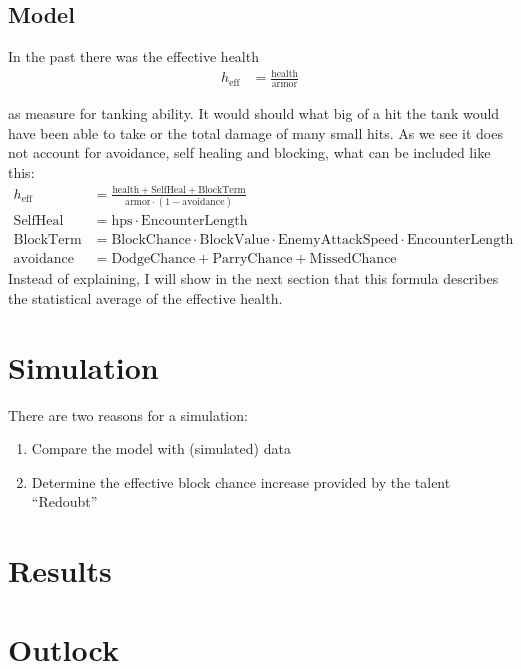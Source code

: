\documentclass[a4paper,10pt]{article}
\begin{document}
\subsection{Model}
In the past there was the effective health 
\begin{align*}
 h_\mathrm{eff}&=\frac{\mathrm{health}}{\mathrm{armor}}
\end{align*}

as measure for tanking ability. It would should what big of a hit the tank would have been able to take or the total damage of many small hits. As we see it does not account for avoidance, self healing and blocking, what can be included like this:
\begin{align*}
 h_\mathrm{eff}&=\frac{\mathrm{health}+\mathrm{SelfHeal}+\mathrm{BlockTerm}}{\mathrm{armor}\cdot(1-\mathrm{avoidance})}\\
 \mathrm{SelfHeal}&=\mathrm{hps}\cdot \mathrm{EncounterLength}\\
 \mathrm{BlockTerm}&=\mathrm{BlockChance}\cdot\mathrm{BlockValue}\cdot\mathrm{EnemyAttackSpeed}\cdot \mathrm{EncounterLength}\\
 \mathrm{avoidance}&=\mathrm{DodgeChance}+\mathrm{ParryChance}+\mathrm{MissedChance}
\end{align*}
Instead of explaining, I will show in the next section that this formula describes the statistical average of the effective health.
\section{Simulation}
There are two reasons for a simulation:
\begin{enumerate}
 \item Compare the model with (simulated) data
 \item Determine the effective block chance increase provided by the talent ``Redoubt''
\end{enumerate}

\section{Results}
\section{Outlock}
\end{document}
